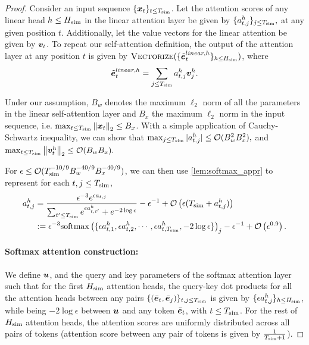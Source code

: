 \begin{proof}
   

    Consider an input sequence $\{{\bm{x}}_t\}_{t \le T_{\text{sim}}}$.
    Let the attention scores of any linear head $h \le H_{\text{sim}}$ in the linear attention layer be given by $\{a^{h}_{t, j}\}_{j \le T_{\text{sim}}},$ at any given position $t$. Additionally, let the value vectors for the linear attention be given by ${\bm{v}}_t$. To repeat our self-attention definition, the output of the attention layer at any position $t$ is given by $\attmerge (\{ \Tilde{\ve}^{linear, h}_t \}_{h \le \simu{H}} )$, where
    \begin{align*}
        \Tilde{\ve}^{linear, h}_t = \sum_{ j \le \simu{T}} a^h_{t, j} \vv^h_j.
    \end{align*}

    
    Under our assumption, $B_w$ denotes the maximum $\ell_2$ norm of all the parameters in the linear self-attention layer and $B_x$ the maximum $\ell_2$ norm in the input sequence, i.e. $\max_{t \le T_{\text{sim}}} \left\|{\bm{x}}_t\right\|_2 \le B_x$. With a simple application of Cauchy-Schwartz inequality, we can show that $\max_{j \le T_{\text{sim}}} |a^{h}_{t, j}| \le \mathcal{O}(B_w^2 B_x^2), $ and $\max_{t \le T_{\text{sim}}} \left\|{\bm{v}}^h_t\right\|_2 \le \mathcal{O}(B_w B_x).$

    
    For  $\epsilon \le \mathcal{O} (T_{\text{sim}}^{-10/9} B_w^{-40/9} B_x^{-40/9} ) $, we can then use \cref{lem:softmax_appr} to represent for each $t, j \le T_{\text{sim}}$,
    \begin{align*}
         a^{h}_{t, j} &=  \frac{ \epsilon^{-3} e^{ 
\epsilon a_{t, j} } }{ \sum_{ t' \le T_{\text{sim}} } e^{ \epsilon a^{h}_{t, t'}  } + e^{ -2 \log \epsilon } } - \epsilon^{-1} + \mathcal{O}\left( \epsilon(  T_{\text{sim}} + a^{h}_{t, j} ) \right) \\&
:= \epsilon^{-3} \mathrm{softmax}\left( \{  \epsilon a^{h}_{t, 1}, \epsilon a^{h}_{t, 2}, \cdots, \epsilon a^{h}_{t, T_{\text{sim}}}, -2 \log \epsilon \} \right)_j - \epsilon^{-1} +  \mathcal{O}\left( \epsilon^{0.9} \right).
    \end{align*}


    \paragraph{Softmax attention construction:} We define ${\bm{u}}$, and the query and key parameters of the softmax attention layer such that for the first $H_{\text{sim}}$ attention heads,  the query-key dot products for all the attention heads between any pairs $\{(\Bar{\ve}_t, \Bar{\ve}_j)\}_{t, j \le \simu{T}}$ is given by $\{ \epsilon a^{h}_{t, j} \}_{h \le H_{\text{sim}}}$, while being $-2\log \epsilon$ between ${\bm{u}}$ and any token $\Bar{\ve}_t$, with $t \le T_{\text{sim}}$. For the rest  of $H_{\text{sim}}$ attention heads, the attention scores are uniformly distributed across all pairs of tokens (attention score between any pair of tokens is given by $\frac{1}{T_{\text{sim}} + 1}$). 



\end{proof}
